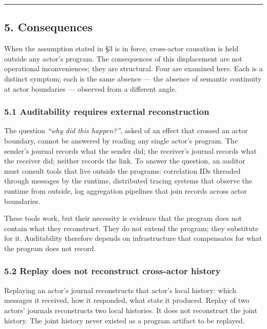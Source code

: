 \documentclass[
]{article}
\begin{document}
\begin{center}\rule{0.5\linewidth}{0.5pt}\end{center}

\subsection{5. Consequences}\label{consequences}

When the assumption stated in §3 is in force, cross-actor causation is
held outside any actor's program. The consequences of this displacement
are not operational inconveniences; they are structural. Four are
examined here. Each is a distinct symptom; each is the same absence ---
the absence of semantic continuity at actor boundaries --- observed from
a different angle.

\subsubsection{5.1 Auditability requires external
reconstruction}\label{auditability-requires-external-reconstruction}

The question \emph{``why did this happen?''}, asked of an effect that
crossed an actor boundary, cannot be answered by reading any single
actor's program. The sender's journal records what the sender did; the
receiver's journal records what the receiver did; neither records the
link. To answer the question, an auditor must consult tools that live
outside the programs: correlation IDs threaded through messages by the
runtime, distributed tracing systems that observe the runtime from
outside, log aggregation pipelines that join records across actor
boundaries.

These tools work, but their necessity is evidence that the program does
not contain what they reconstruct. They do not extend the program; they
substitute for it. Auditability therefore depends on infrastructure that
compensates for what the program does not record.

\subsubsection{5.2 Replay does not reconstruct cross-actor
history}\label{replay-does-not-reconstruct-cross-actor-history}

Replaying an actor's journal reconstructs that actor's local history:
which messages it received, how it responded, what state it produced.
Replay of two actors' journals reconstructs two local histories. It does
not reconstruct the joint history. The joint history never existed as a
program artifact to be replayed.
\end{document}
